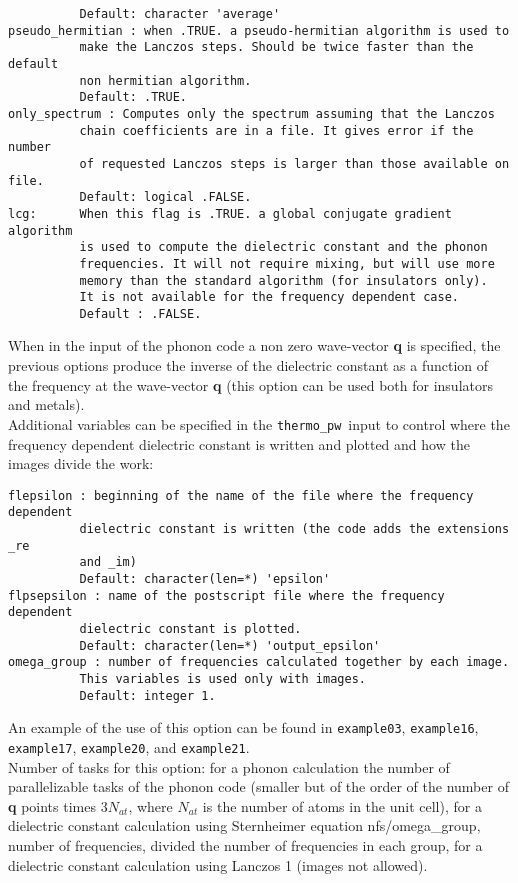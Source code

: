 \documentclass[12pt,a4paper]{article}
\def\thermo{\texttt{thermo\_pw}}
\begin{document}
\begin{verbatim}
          Default: character 'average'
pseudo_hermitian : when .TRUE. a pseudo-hermitian algorithm is used to 
          make the Lanczos steps. Should be twice faster than the default
          non hermitian algorithm.
          Default: .TRUE.
only_spectrum : Computes only the spectrum assuming that the Lanczos
          chain coefficients are in a file. It gives error if the number
          of requested Lanczos steps is larger than those available on file.
          Default: logical .FALSE.
lcg:      When this flag is .TRUE. a global conjugate gradient algorithm
          is used to compute the dielectric constant and the phonon 
          frequencies. It will not require mixing, but will use more
          memory than the standard algorithm (for insulators only).
          It is not available for the frequency dependent case.
          Default : .FALSE.
\end{verbatim}
When in the input of the phonon code a non zero wave-vector {\bf q}
is specified, the previous options produce the inverse of the dielectric 
constant as a function of the frequency at the wave-vector {\bf q}
(this option can be used both for insulators and metals). \\
Additional variables can be specified in the \thermo\ input to control
where the frequency dependent dielectric constant is written and plotted
and how the images divide the work:
\begin{verbatim}
flepsilon : beginning of the name of the file where the frequency dependent 
          dielectric constant is written (the code adds the extensions _re
          and _im)
          Default: character(len=*) 'epsilon'
flpsepsilon : name of the postscript file where the frequency dependent 
          dielectric constant is plotted.
          Default: character(len=*) 'output_epsilon'
omega_group : number of frequencies calculated together by each image.
          This variables is used only with images.
          Default: integer 1.
\end{verbatim}
An example of the use of this option can be found in \texttt{example03},
\texttt{example16}, \texttt{example17}, \texttt{example20}, and 
\texttt{example21}. \\
Number of tasks for this option: for a phonon calculation the
number of parallelizable tasks of the 
phonon code (smaller but of the order of the number of {\bf q} points times 
$3 N_{at}$, where $N_{at}$ is the number of atoms in the unit cell), 
for a dielectric constant calculation using Sternheimer equation
nfs/omega\_group, number of frequencies, divided the number of 
frequencies in each group, for a dielectric constant calculation
using Lanczos 1 (images not allowed). \\
\end{document}
